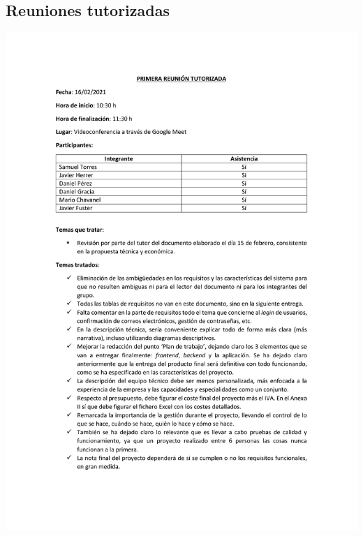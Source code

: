 \documentclass{article}
\begin{document}
\subsection*{Reuniones tutorizadas}
\includegraphics[width=\textwidth]{../images/actas/Acta_reunion_tutorizada_1.pdf}
\end{document}
